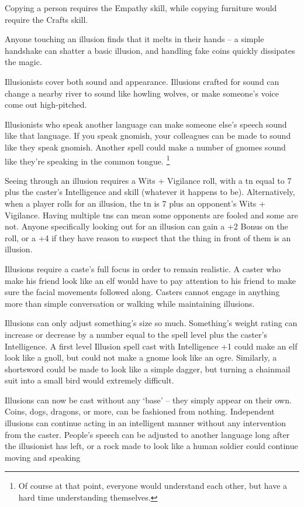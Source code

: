 \documentclass[titlepage,a4paper,openany]{book}
\begin{document}
\begin{multicols}{2}
Copying a person requires the Empathy skill, while copying furniture would require the Crafts skill.

Anyone touching an illusion finds that it melts in their hands -- a simple handshake can shatter a basic illusion, and handling fake coins quickly dissipates the magic.

Illusionists cover both sound and appearance.  Illusions crafted for sound can change a nearby river to sound like howling wolves, or make someone's voice come out high-pitched.

Illusionists who speak another language can make someone else's speech sound like that language.  If you speak gnomish, your colleagues can be made to sound like they speak gnomish.  Another spell could make a number of gnomes sound like they're speaking in the common tongue.  \footnote{Of course at that point, everyone would understand each other, but have a hard time understanding themselves.}

Seeing through an illusion requires a Wits + Vigilance roll, with a \gls{tn} equal to 7 plus the caster's Intelligence and skill (whatever it happens to be).  Alternatively, when a player rolls for an illusion, the \gls{tn} is 7 plus an opponent's Wits + Vigilance.  Having multiple \glspl{tn} can mean some opponents are fooled and some are not.  Anyone specifically looking out for an illusion can gain a +2 Bonus on the roll, or a +4 if they have reason to suspect that the thing in front of them is an illusion.

Illusions require a caste's full focus in order to remain realistic.  A caster who make his friend look like an elf would have to pay attention to his friend to make sure the facial movements followed along.  Casters cannot engage in anything more than simple conversation or walking while maintaining illusions.

Illusions can only adjust something's size so much.  Something's weight rating can increase or decrease by a number equal to the spell level plus the caster's Intelligence.  A first level Illusion spell cast with Intelligence +1 could make an elf look like a gnoll, but could not make a gnome look like an ogre.  Similarly, a shortsword could be made to look like a simple dagger, but turning a chainmail suit into a small bird would extremely difficult.


Illusions can now be cast without any `base' -- they simply appear on their own.  Coins, dogs, dragons, or more, can be fashioned from nothing.  Independent illusions can continue acting in an intelligent manner without any intervention from the caster.   People's speech can be adjusted to another language long after the illusionist has left, or a rock made to look like a human soldier could continue moving and speaking 


\end{multicols}
\end{document}
